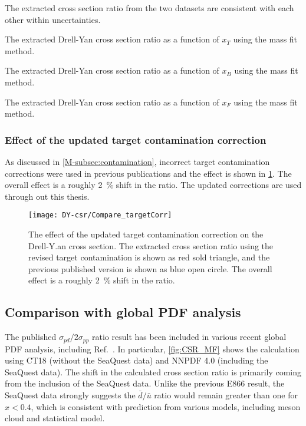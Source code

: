 \documentclass[../main.tex]{subfiles}
\begin{document}
The extracted cross section ratio from the two datasets are consistent with each other within uncertainties.
\begin{table}[h!]
	\centering
	\caption{The extracted Drell-Yan cross section ratio as a function of $x_T$ using the mass fit method.}
	\label{tab:DY-MF-x2}
	
\end{table}
\begin{table}[h!]
	\centering
	\caption{The extracted Drell-Yan cross section ratio as a function of $x_B$ using the mass fit method.}
	\label{tab:DY-MF-x1}
	
\end{table}
\begin{table}[h!]
	\centering
	\caption{The extracted Drell-Yan cross section ratio as a function of $x_F$ using the mass fit method.}
	\label{tab:DY-MF-xF}
	
\end{table}
\FloatBarrier

\subsubsection{Effect of the updated target contamination correction}
\label{subsubsec:contamination_result}
As discussed in \cref{M-subsec:contamination}, incorrect target contamination corrections were used
in previous publications and the effect is shown in \cref{fig:contaimination_CSR}.
The overall effect is a roughly \SI{2}{\percent} shift in the ratio. The updated corrections
are used through out this thesis.
\begin{figure}[h!]
	\centering
	\texttt{[image: DY-csr/Compare\_targetCorr]}
	\caption{The effect of the updated target contamination correction on the Drell-Y.an
		cross section. The extracted cross section ratio using the revised target contamination
		is shown as red sold triangle, and the previous published version is shown as blue open
		circle. The overall effect is a roughly \SI{2}{\percent} shift in the ratio. }
	\label{fig:contaimination_CSR}
\end{figure}


\subsection{Comparison with global PDF analysis}
The published $\sigma_{pd}/2\sigma_{pp}$ ratio result has been included in various recent global
PDF analysis, including Ref.~\cite{cocuzza2021,guzzi2022,accardi2023,alekhin2023}.
In particular, \cref{fig:CSR_MF} shows the calculation using CT18 (without the SeaQuest data)
and NNPDF 4.0 (including the SeaQuest data). The shift in the calculated cross section ratio is primarily
coming from the inclusion of the SeaQuest data. Unlike the previous E866 result, the SeaQuest data
strongly suggests the $\bar{d}/\bar{u}$ ratio would remain greater than one for $x<0.4$, which is
consistent with prediction from various models, including meson cloud and statistical model.
\end{document}
